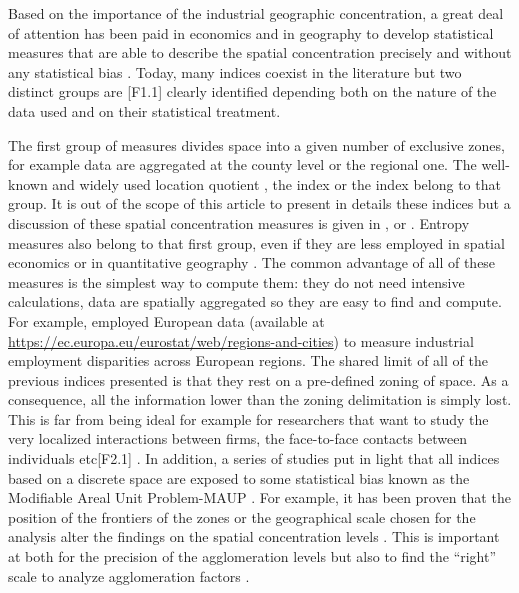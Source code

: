 \documentclass[fleqn,10pt]{latex/stylish_article} %
\begin{document}
Based on the importance of the industrial geographic concentration, a great deal of attention has been paid in economics and in geography to develop statistical measures that are able to describe the spatial concentration precisely and without any statistical bias \citep{Arbia2021}.
Today, many indices coexist in the literature but two distinct groups are {[}F1.1{]} clearly identified depending both on the nature of the data used and on their statistical treatment.

The first group of measures divides space into a given number of exclusive zones, for example data are aggregated at the county level or the regional one.
The well-known and widely used location quotient \citep{Florence1972}, the \citet{Gini1912} index or the \citet{Ellison1997} index belong to that group.
It is out of the scope of this article to present in details these indices but a discussion of these spatial concentration measures is given in \citet{Sweeney2004}, \citet{Bickenbach2008} or \citet{Combes2008}.
Entropy measures also belong to that first group, even if they are less employed in spatial economics or in quantitative geography \citep[see for example][ for an evaluation of spatial concentration of activities across regions with the \citet{Theil1967} index]{Brulhart2005}. The common advantage of all of these measures is the simplest way to compute them: they do not need intensive calculations, data are spatially aggregated so they are easy to find and compute. For example, \citet{Marcon2019} employed European data (available at \url{https://ec.europa.eu/eurostat/web/regions-and-cities}) to measure industrial employment disparities across European regions. The shared limit of all of the previous indices presented is that they rest on a pre-defined zoning of space. As a consequence, all the information lower than the zoning delimitation is simply lost. This is far from being ideal for example for researchers that want to study the very localized interactions between firms, the face-to-face contacts between individuals etc{[}F2.1{]} .
In addition, a series of studies put in light that all indices based on a discrete space are exposed to some statistical bias known as the Modifiable Areal Unit Problem-MAUP \citep{Openshaw1979, Arbia1989}.
For example, it has been proven that the position of the frontiers of the zones or the geographical scale chosen for the analysis alter the findings on the spatial concentration levels \citep{Arbia2001}.
This is important at both for the precision of the agglomeration levels but also to find the \enquote{right} scale to analyze agglomeration factors \citep{Rosenthal2020}.
\end{document}
